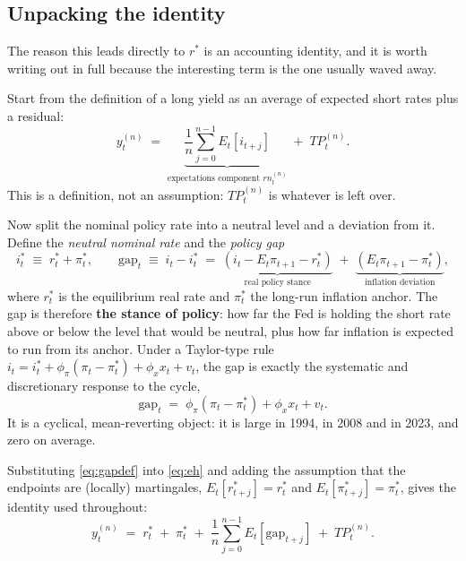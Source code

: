 \documentclass[11pt]{article}
\newcommand{\rs}{$r^{*}$}
\begin{document}
\subsection{Unpacking the identity}
\label{sec:identity}

The reason this leads directly to \rs{} is an accounting identity, and it is worth writing
out in full because the interesting term is the one usually waved away.

Start from the definition of a long yield as an average of expected short rates plus a
residual:
\begin{equation}
y^{(n)}_t \;=\; \underbrace{\frac{1}{n}\sum_{j=0}^{n-1} E_t\!\left[i_{t+j}\right]}_{\text{expectations component } rn^{(n)}_t} \;+\; TP^{(n)}_t .
\label{eq:eh}
\end{equation}
This is a definition, not an assumption: $TP^{(n)}_t$ is whatever is left over.

Now split the nominal policy rate into a neutral level and a deviation from it. Define the
\emph{neutral nominal rate} and the \emph{policy gap}
\begin{equation}
i^{*}_t \;\equiv\; r^{*}_t + \pi^{*}_t ,
\qquad
\text{gap}_t \;\equiv\; i_t - i^{*}_t \;=\; \underbrace{\left(i_t - E_t\pi_{t+1} - r^{*}_t\right)}_{\text{real policy stance}} \;+\; \underbrace{\left(E_t\pi_{t+1} - \pi^{*}_t\right)}_{\text{inflation deviation}} ,
\label{eq:gapdef}
\end{equation}
where $r^{*}_t$ is the equilibrium real rate and $\pi^{*}_t$ the long-run inflation
anchor. The gap is therefore \textbf{the stance of policy}: how far the Fed is holding the
short rate above or below the level that would be neutral, plus how far inflation is
expected to run from its anchor. Under a Taylor-type rule
$i_t = i^{*}_t + \phi_\pi(\pi_t-\pi^{*}_t) + \phi_x x_t + v_t$, the gap is exactly the
systematic and discretionary response to the cycle,
\begin{equation}
\text{gap}_t \;=\; \phi_\pi\!\left(\pi_t-\pi^{*}_t\right) + \phi_x x_t + v_t .
\label{eq:taylor}
\end{equation}
It is a cyclical, mean-reverting object: it is large in 1994, in 2008 and in 2023, and zero
on average.

Substituting \eqref{eq:gapdef} into \eqref{eq:eh} and adding the assumption that the
endpoints are (locally) martingales, $E_t[r^{*}_{t+j}]=r^{*}_t$ and
$E_t[\pi^{*}_{t+j}]=\pi^{*}_t$, gives the identity used throughout:
\begin{equation}
y^{(n)}_t \;=\; r^{*}_t \;+\; \pi^{*}_t \;+\; \frac{1}{n}\sum_{j=0}^{n-1} E_t\!\left[\text{gap}_{t+j}\right] \;+\; TP^{(n)}_t .
\label{eq:identity}
\end{equation}
\end{document}
